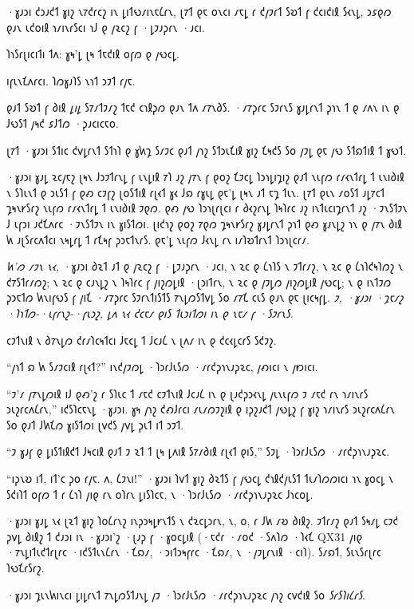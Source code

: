 ·𐑣𐑨𐑮𐑦 𐑒𐑮𐑨𐑒𐑑 𐑣𐑦𐑟 𐑯𐑳𐑒𐑩𐑤𐑟 𐑦𐑯 𐑛𐑦𐑑𐑻𐑥𐑦𐑯𐑱𐑖𐑩𐑯, 𐑚𐑳𐑑 𐑞𐑱 𐑴𐑯𐑤𐑦 𐑥𐑱𐑛 𐑩 𐑒𐑢𐑲𐑩𐑑 𐑕𐑹𐑑 𐑝 𐑒𐑤𐑦𐑒𐑦𐑙 𐑕𐑬𐑯𐑛, 𐑮𐑭𐑞𐑼 𐑞𐑨𐑯 𐑧𐑒𐑴𐑦𐑙 𐑪𐑥𐑦𐑯𐑩𐑕𐑤𐑦 𐑪𐑓 𐑞 𐑢𐑷𐑤𐑟 𐑝 ·𐑛𐑲𐑨𐑜𐑩𐑯 ·𐑨𐑤𐑦.

𐑐𐑪𐑕𐑩𐑚𐑦𐑤𐑦𐑑𐑦 𐑑𐑵: 𐑣𐑰'𐑛 𐑚𐑰 𐑑𐑱𐑒𐑦𐑙 𐑴𐑝𐑼 𐑞 𐑢𐑻𐑤𐑛.

𐑦𐑝𐑧𐑯𐑗𐑵𐑩𐑤𐑦. 𐑐𐑼𐑣𐑨𐑐𐑕 𐑯𐑪𐑑 𐑮𐑲𐑑 𐑩𐑢𐑱.

𐑞𐑨𐑑 𐑕𐑹𐑑 𐑝 𐑔𐑦𐑙 \emph{𐑛𐑦𐑛} 𐑕𐑳𐑥𐑑𐑲𐑥𐑟 𐑑𐑱𐑒 𐑤𐑪𐑙𐑜𐑼 𐑞𐑨𐑯 𐑑𐑵 𐑥𐑳𐑯𐑔𐑕. ·𐑥𐑳𐑜𐑩𐑤 𐑕𐑲𐑩𐑯𐑕 𐑣𐑨𐑛𐑩𐑯𐑑 𐑜𐑪𐑯 𐑑 𐑞 𐑥𐑵𐑯 𐑦𐑯 𐑞 𐑓𐑻𐑕𐑑 𐑢𐑰𐑒 𐑭𐑓𐑑𐑼 ·𐑜𐑨𐑤𐑦𐑤𐑱𐑴.

𐑚𐑳𐑑 ·𐑣𐑨𐑮𐑦 𐑕𐑑𐑦𐑤 𐑒𐑫𐑛𐑩𐑯𐑑 𐑕𐑑𐑪𐑐 𐑞 𐑣𐑿𐑡 𐑕𐑥𐑲𐑤 𐑞𐑨𐑑 𐑢𐑪𐑟 𐑕𐑑𐑮𐑧𐑗𐑦𐑙 𐑣𐑦𐑟 𐑗𐑰𐑒𐑕 𐑕𐑴 𐑢𐑲𐑛 𐑞𐑱 𐑢𐑻 𐑕𐑑𐑸𐑑𐑦𐑙 𐑑 𐑣𐑻𐑑.

·𐑣𐑨𐑮𐑦 𐑣𐑨𐑛 𐑷𐑤𐑢𐑱𐑟 𐑚𐑰𐑯 𐑓𐑮𐑲𐑑𐑩𐑯𐑛 𐑝 𐑧𐑯𐑛𐑦𐑙 𐑳𐑐 𐑨𐑟 𐑢𐑳𐑯 𐑝 𐑞𐑴𐑟 𐑗𐑲𐑤𐑛 𐑐𐑮𐑪𐑛𐑦𐑡𐑦𐑟 𐑞𐑨𐑑 𐑯𐑧𐑝𐑼 𐑩𐑥𐑬𐑯𐑑𐑩𐑛 𐑑 𐑧𐑯𐑦𐑔𐑦𐑙 𐑯 𐑕𐑐𐑧𐑯𐑑 𐑞 𐑮𐑧𐑕𐑑 𐑝 𐑞𐑺 𐑤𐑲𐑝𐑟 𐑚𐑴𐑕𐑑𐑦𐑙 𐑩𐑚𐑬𐑑 𐑣𐑬 𐑓𐑸 𐑩𐑣𐑧𐑛 𐑞𐑱'𐑛 𐑚𐑰𐑯 𐑨𐑑 𐑱𐑡 𐑑𐑧𐑯. 𐑚𐑳𐑑 𐑞𐑧𐑯 𐑥𐑴𐑕𐑑 𐑨𐑛𐑳𐑤𐑑 𐑡𐑰𐑯𐑾𐑕𐑩𐑟 𐑯𐑧𐑝𐑼 𐑩𐑥𐑬𐑯𐑑𐑩𐑛 𐑑 𐑧𐑯𐑦𐑔𐑦𐑙 𐑲𐑞𐑼. 𐑞𐑺 𐑢𐑻 𐑐𐑮𐑪𐑚𐑩𐑚𐑤𐑦 𐑩 𐑔𐑬𐑟𐑩𐑯𐑛 𐑐𐑰𐑐𐑩𐑤 𐑨𐑟 𐑦𐑯𐑑𐑧𐑤𐑦𐑡𐑩𐑯𐑑 𐑨𐑟 ·𐑲𐑯𐑕𐑑𐑲𐑯 𐑓 𐑧𐑝𐑮𐑦 𐑨𐑒𐑗𐑵𐑩𐑤 ·𐑲𐑯𐑕𐑑𐑲𐑯 𐑦𐑯 𐑣𐑦𐑕𐑑𐑼𐑦. 𐑚𐑦𐑒𐑪𐑟 𐑞𐑴𐑟 𐑳𐑞𐑼 𐑡𐑰𐑯𐑾𐑕𐑩𐑟 𐑣𐑨𐑛𐑩𐑯𐑑 𐑜𐑪𐑑 𐑞𐑺 𐑣𐑨𐑯𐑛𐑟 𐑪𐑯 𐑞 𐑢𐑳𐑯 𐑔𐑦𐑙 𐑿 𐑨𐑚𐑕𐑩𐑤𐑵𐑑𐑤𐑦 𐑯𐑰𐑛𐑩𐑛 𐑑 𐑩𐑗𐑰𐑝 𐑜𐑮𐑱𐑑𐑯𐑩𐑕. 𐑞𐑱'𐑛 𐑯𐑧𐑝𐑼 𐑓𐑬𐑯𐑛 𐑩𐑯 𐑦𐑥𐑐𐑹𐑑𐑩𐑯𐑑 𐑐𐑮𐑪𐑚𐑤𐑩𐑥.

\emph{𐑿'𐑼 𐑥𐑲𐑯 𐑯𐑬,} ·𐑣𐑨𐑮𐑦 𐑔𐑷𐑑 𐑨𐑑 𐑞 𐑢𐑷𐑤𐑟 𐑝 ·𐑛𐑲𐑨𐑜𐑩𐑯 ·𐑨𐑤𐑦, 𐑯 𐑷𐑤 𐑞 𐑖𐑪𐑐𐑕 𐑯 𐑲𐑑𐑩𐑥𐑟, 𐑯 𐑷𐑤 𐑞 𐑖𐑪𐑐𐑒𐑰𐑐𐑼𐑟 𐑯 𐑒𐑳𐑕𐑑𐑩𐑥𐑼𐑟; 𐑯 𐑷𐑤 𐑞 𐑤𐑨𐑯𐑛𐑟 𐑯 𐑐𐑰𐑐𐑩𐑤 𐑝 𐑢𐑦𐑟𐑼𐑛𐑦𐑙 ·𐑚𐑮𐑦𐑑𐑩𐑯, 𐑯 𐑷𐑤 𐑞 𐑢𐑲𐑛𐑼 𐑢𐑦𐑟𐑼𐑛𐑦𐑙 𐑢𐑻𐑤𐑛; 𐑯 𐑞 𐑦𐑯𐑑𐑲𐑼 𐑜𐑮𐑱𐑑𐑼 𐑿𐑯𐑦𐑝𐑻𐑕 𐑝 𐑢𐑦𐑗 ·𐑥𐑳𐑜𐑩𐑤 𐑕𐑲𐑩𐑯𐑑𐑦𐑕𐑑𐑕 𐑳𐑯𐑛𐑼𐑕𐑑𐑫𐑛 𐑕𐑴 𐑥𐑳𐑗 𐑤𐑧𐑕 𐑞𐑨𐑯 𐑞𐑱 𐑚𐑦𐑤𐑰𐑝𐑛. \emph{𐑲, ·𐑣𐑨𐑮𐑦 ·𐑡𐑱𐑥𐑟 ·𐑐𐑪𐑑𐑼-·𐑧𐑝𐑩𐑯𐑟-·𐑝𐑧𐑮𐑟, 𐑛𐑵 𐑯𐑬 𐑒𐑤𐑱𐑥 𐑞𐑦𐑕 𐑑𐑧𐑮𐑦𐑑𐑼𐑦 𐑦𐑯 𐑞 𐑯𐑱𐑥 𐑝 ·𐑕𐑲𐑩𐑯𐑕.}

𐑤𐑲𐑑𐑯𐑦𐑙 𐑯 𐑔𐑳𐑯𐑛𐑼 𐑒𐑩𐑥𐑐𐑤𐑰𐑑𐑤𐑦 𐑓𐑱𐑤𐑛 𐑑 𐑓𐑤𐑨𐑖 𐑯 𐑚𐑵𐑥 𐑦𐑯 𐑞 𐑒𐑤𐑬𐑛𐑤𐑩𐑕 𐑕𐑒𐑲𐑟.

“𐑢𐑪𐑑 𐑸 𐑿 𐑕𐑥𐑲𐑤𐑦𐑙 𐑩𐑚𐑬𐑑?” 𐑦𐑯𐑒𐑢𐑲𐑼𐑛 ·𐑐𐑮𐑩𐑓𐑧𐑕𐑼 ·𐑥𐑩𐑒𐑜𐑪𐑯𐑨𐑜𐑷𐑤, 𐑢𐑺𐑦𐑤𐑦 𐑯 𐑢𐑽𐑦𐑤𐑦.

“𐑲'𐑥 𐑢𐑳𐑯𐑛𐑼𐑦𐑙 𐑦𐑓 𐑞𐑺'𐑟 𐑩 𐑕𐑐𐑧𐑤 𐑑 𐑥𐑱𐑒 𐑤𐑲𐑑𐑯𐑦𐑙 𐑓𐑤𐑨𐑖 𐑦𐑯 𐑞 𐑚𐑨𐑒𐑜𐑮𐑬𐑯𐑛 𐑢𐑧𐑯𐑧𐑝𐑼 𐑲 𐑥𐑱𐑒 𐑩𐑯 𐑪𐑥𐑦𐑯𐑩𐑕 𐑮𐑧𐑟𐑩𐑤𐑵𐑖𐑩𐑯,” 𐑦𐑒𐑕𐑐𐑤𐑱𐑯𐑛 ·𐑣𐑨𐑮𐑦. 𐑣𐑰 𐑢𐑪𐑟 𐑒𐑺𐑓𐑩𐑤𐑦 𐑥𐑧𐑥𐑼𐑲𐑟𐑦𐑙 𐑞 𐑦𐑜𐑟𐑨𐑒𐑑 𐑢𐑻𐑛𐑟 𐑝 𐑣𐑦𐑟 𐑪𐑥𐑦𐑯𐑩𐑕 𐑮𐑧𐑟𐑩𐑤𐑵𐑖𐑩𐑯 𐑕𐑴 𐑞𐑨𐑑 𐑓𐑿𐑗𐑼 𐑣𐑦𐑕𐑑𐑼𐑦 𐑚𐑫𐑒𐑕 𐑢𐑫𐑛 𐑜𐑧𐑑 𐑦𐑑 𐑮𐑲𐑑.

“𐑲 𐑣𐑨𐑝 𐑞 𐑛𐑦𐑕𐑑𐑦𐑙𐑒𐑑 𐑓𐑰𐑤𐑦𐑙 𐑞𐑨𐑑 𐑲 𐑷𐑑 𐑑 𐑚𐑰 𐑛𐑵𐑦𐑙 𐑕𐑳𐑥𐑔𐑦𐑙 𐑩𐑚𐑬𐑑 𐑞𐑦𐑕,” 𐑕𐑲𐑛 ·𐑐𐑮𐑩𐑓𐑧𐑕𐑼 ·𐑥𐑩𐑒𐑜𐑪𐑯𐑨𐑜𐑷𐑤.

“𐑦𐑜𐑯𐑹 𐑦𐑑, 𐑦𐑑'𐑤 𐑜𐑴 𐑩𐑢𐑱. 𐑵, 𐑖𐑲𐑯𐑦!” ·𐑣𐑨𐑮𐑦 𐑐𐑫𐑑 𐑣𐑦𐑟 𐑔𐑷𐑑𐑕 𐑝 𐑢𐑻𐑤𐑛 𐑒𐑪𐑙𐑒𐑢𐑧𐑕𐑑 𐑑𐑧𐑥𐑐𐑼𐑼𐑦𐑤𐑦 𐑪𐑯 𐑣𐑴𐑤𐑛 𐑯 𐑕𐑒𐑦𐑐𐑑 𐑴𐑝𐑼 𐑑 𐑩 𐑖𐑪𐑐 𐑢𐑦𐑞 𐑩𐑯 𐑴𐑐𐑩𐑯 𐑛𐑦𐑕𐑐𐑤𐑱, 𐑯 ·𐑐𐑮𐑩𐑓𐑧𐑕𐑼 ·𐑥𐑩𐑒𐑜𐑪𐑯𐑨𐑜𐑷𐑤 𐑓𐑪𐑤𐑴𐑛.

\later

·𐑣𐑨𐑮𐑦 𐑣𐑨𐑛 𐑯𐑬 𐑚𐑷𐑑 𐑣𐑦𐑟 𐑐𐑴𐑖𐑩𐑯𐑟 𐑦𐑯𐑜𐑮𐑰𐑛𐑾𐑯𐑑𐑕 𐑯 𐑒𐑷𐑤𐑛𐑮𐑩𐑯, 𐑯, 𐑴, 𐑩 𐑓𐑿 𐑥𐑹 𐑔𐑦𐑙𐑟. 𐑲𐑑𐑩𐑥𐑟 𐑞𐑨𐑑 𐑕𐑰𐑥𐑛 𐑤𐑲𐑒 𐑜𐑫𐑛 𐑔𐑦𐑙𐑟 𐑑 𐑒𐑨𐑮𐑦 𐑦𐑯 ·𐑣𐑨𐑮𐑦'𐑟 ·𐑚𐑨𐑜 𐑝 ·𐑣𐑴𐑤𐑛𐑦𐑙 (·𐑱𐑒𐑩 ·𐑥𐑴𐑒 ·𐑕𐑵𐑐𐑼 ·𐑐𐑬𐑗 QX31 𐑢𐑦𐑞 ·𐑳𐑯𐑛𐑦𐑑𐑧𐑒𐑑𐑩𐑚𐑩𐑤 ·𐑦𐑒𐑕𐑑𐑧𐑯𐑖𐑩𐑯 ·𐑗𐑸𐑥, ·𐑮𐑦𐑑𐑮𐑰𐑝𐑩𐑤 ·𐑗𐑸𐑥, 𐑯 ·𐑢𐑲𐑛𐑩𐑯𐑦𐑙 ·𐑤𐑦𐑐). 𐑕𐑥𐑸𐑑, 𐑕𐑧𐑯𐑕𐑩𐑚𐑩𐑤 𐑐𐑻𐑗𐑩𐑕𐑩𐑟.

·𐑣𐑨𐑮𐑦 𐑡𐑧𐑯𐑿𐑦𐑯𐑤𐑦 𐑛𐑦𐑛𐑩𐑯𐑑 𐑳𐑯𐑛𐑼𐑕𐑑𐑨𐑯𐑛 𐑢𐑲 ·𐑐𐑮𐑩𐑓𐑧𐑕𐑼 ·𐑥𐑩𐑒𐑜𐑪𐑯𐑨𐑜𐑷𐑤 𐑢𐑪𐑟 𐑤𐑫𐑒𐑦𐑙 𐑕𐑴 \emph{𐑕𐑩𐑕𐑐𐑦𐑖𐑩𐑕}.

